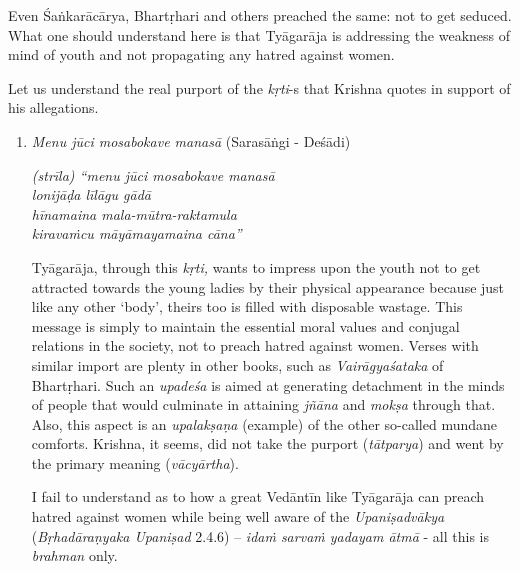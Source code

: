 Even Śaṅkarācārya, Bhartṛhari and others preached the same: not to get seduced. What one should understand here is that Tyāgarāja is addressing the weakness of mind of youth and not propagating any hatred against women.

Let us understand the real purport of the \textit{kṛti}-s that Krishna quotes in support of his allegations.

\vspace{-.3cm}

\begin{enumerate}
\itemsep=0pt

 \item 
 \textit{Menu jūci mosabokave manasā} (Sarasāṅgi - Deśādi)

\begin{longquote}
\textit{(strīla) “menu jūci mosabokave manasā}\\ \textit{lonijāḍa līlāgu gādā}\\ \textit{hīnamaina mala-mūtra-raktamula}\\ \textit{kiravaṁcu māyāmayamaina cāna”}
\end{longquote}

 Tyāgarāja, through this \textit{kṛti,} wants to impress upon the youth not to get attracted towards the young ladies by their physical appearance because just like any other ‘body’, theirs too is filled with disposable wastage. This message is simply to maintain the essential moral values and conjugal relations in the society, not to preach hatred against women. Verses with similar import are plenty in other books, such as \textit{Vairāgyaśataka} of Bhartṛhari. Such an \textit{upadeśa} is aimed at generating detachment in the minds of people that would culminate in attaining \textit{jñāna} and \textit{mokṣa} through that. Also, this aspect is an \textit{upalakṣaṇa} (example) of the other so-called mundane comforts. Krishna, it seems, did not take the purport (\textit{tātparya}) and went by the primary meaning (\textit{vācyārtha}).

 I fail to understand as to how a great Vedāntīn like Tyāgarāja can preach hatred against women while being well aware of the \textit{Upaniṣadvākya} (\textit{Bṛhadāraṇyaka Upaniṣad} 2.4.6) – \textit{idaṁ sarvaṁ yadayam ātmā} - all this is \textit{brahman} only.


\end{enumerate}
